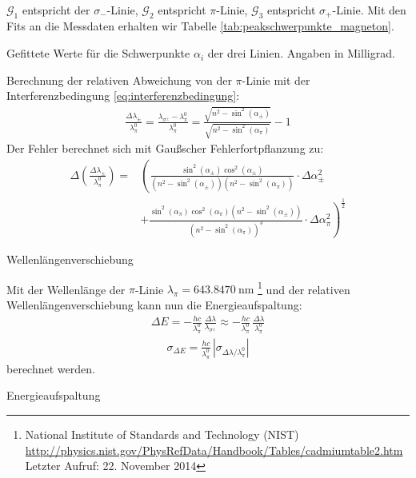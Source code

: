 \documentclass[11pt, a4paper]{article}
\begin{document}
$\mathcal{G}_1$ entspricht der $\sigma_-$-Linie, $\mathcal{G}_2$ entspricht $\pi$-Linie, $\mathcal{G}_3$ entspricht $\sigma_+$-Linie.
Mit den Fits an die Messdaten erhalten wir Tabelle \ref{tab:peakschwerpunkte_magneton}.
\begin{table}[h]
	\centering
	\resizebox{\columnwidth}{!}{%
		}
	\caption{Gefittete Werte für die Schwerpunkte $\alpha_i$ der drei Linien. Angaben in Milligrad.}
	\label{tab:peakschwerpunkte_magneton}
\end{table}
Berechnung der relativen Abweichung von der $\pi$-Linie mit der Interferenzbedingung \ref{eq:interferenzbedingung}:
\begin{align}
	\frac{\Delta \lambda_\pm}{\lambda_\pi^0} = \frac{\lambda_{\sigma^\pm} - \lambda_\pi^0}{\lambda_\pi^0} = \frac{\sqrt{n^2 - \sin^2(\alpha_{\pm})}}{\sqrt{n^2 - \sin^2(\alpha_\pi)}} - 1
\end{align}
Der Fehler berechnet sich mit Gaußscher Fehlerfortpflanzung zu:
\begin{align}
	\Delta \left( \frac{\Delta \lambda_\pm}{\lambda_\pi^0} \right) = & \left( \frac{\sin^2(\alpha_\pm) \cos^2(\alpha_\pm)}{(n^2-\sin^2(\alpha_\pm))(n^2-\sin^2(\alpha_\pi))} \cdot \Delta \alpha_\pm^2 \right. \nonumber\\
	& \left. + \frac{\sin^2(\alpha_\pi) \cos^2(\alpha_\pi) (n^2 - \sin^2(\alpha_\pm))}{(n^2-\sin^2(\alpha_\pi))^3} \cdot \Delta \alpha_\pi^2\right)^\frac{1}{2}
\end{align}

\begin{table}[h]
	\centering
	
	\caption{Wellenlängenverschiebung}
	\label{tab:verschiebung_wellenlaenge}
\end{table}
Mit der Wellenlänge der $\pi$-Linie $\lambda_\pi = \SI{643,8470}{\nano\metre}$ \footnote{National Institute of Standards and Technology (NIST)\\ \url{http://physics.nist.gov/PhysRefData/Handbook/Tables/cadmiumtable2.htm}\\Letzter Aufruf: 22. November 2014} und der relativen Wellenlängenverschiebung kann nun die Energieaufspaltung:
\begin{align}
	\Delta E = -\frac{h c}{\lambda_\pi^0}\,\frac{\Delta \lambda}{\lambda_{\sigma^\pm}} \approx -\frac{h c}{\lambda_\pi^0}\,\frac{\Delta \lambda}{\lambda_\pi^0}
\end{align}
\begin{align}
	\sigma_{\Delta E} = \frac{h c}{\lambda_\pi^0} \, | \sigma_{\Delta \lambda / \lambda_\pi^0} |
\end{align}
berechnet werden.
\begin{table}[h]
	\centering
	
	\caption{Energieaufspaltung}
	\label{tab:energieaufspaltung}
\end{table}
\end{document}
